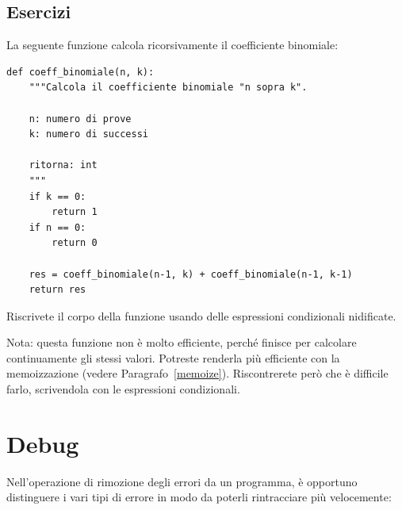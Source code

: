 \documentclass[10pt]{book}
\begin{document}
\section{Esercizi}

\begin{exercise}

La seguente funzione calcola ricorsivamente il coefficiente binomiale:

\begin{verbatim}
def coeff_binomiale(n, k):
    """Calcola il coefficiente binomiale "n sopra k".

    n: numero di prove
    k: numero di successi

    ritorna: int
    """
    if k == 0:
        return 1
    if n == 0:
        return 0

    res = coeff_binomiale(n-1, k) + coeff_binomiale(n-1, k-1)
    return res
\end{verbatim}

Riscrivete il corpo della funzione usando delle espressioni condizionali nidificate.

Nota: questa funzione non è molto efficiente, perché finisce per calcolare continuamente gli stessi valori. Potreste renderla più efficiente con la memoizzazione (vedere Paragrafo~\ref{memoize}). Riscontrerete però che è difficile farlo, scrivendola con le espressioni condizionali.

\end{exercise}


\appendix

\chapter{Debug}

Nell'operazione di rimozione degli errori da un programma, è opportuno distinguere i vari tipi di errore in modo da poterli rintracciare più velocemente:
\end{document}
